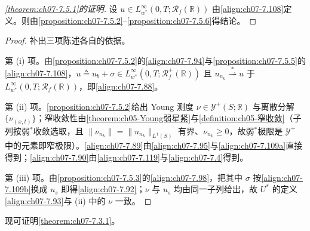 \documentclass[../../main.tex]{subfiles}%
\begin{document}
\begin{proof}[\cref{theorem:ch07-7.5.1}的证明]
设 $u\in L^\infty_{w^*}(0,T;\mathscr{R}_f(\mathbb{R}))$ 由\eqref{align:ch07-7.108}定义。则由\cref{proposition:ch07-7.5.2}--\cref{proposition:ch07-7.5.6}得结论。
\end{proof}

\begin{proof}
补出三项陈述各自的依据。

第 (i) 项。由\cref{proposition:ch07-7.5.2}的\eqref{align:ch07-7.94}与\cref{proposition:ch07-7.5.5}的\eqref{align:ch07-7.108}，$u\triangleq u_b+\sigma\in L^\infty_{w^*}(0,T;\mathscr{R}_f^+(\mathbb{R}))$ 且 $u_{n_k}\stackrel{*}{\rightharpoonup}u$ 于 $L^\infty_{w^*}(0,T;\mathscr{R}_f(\mathbb{R}))$，即\eqref{align:ch07-7.88}。

第 (ii) 项。\cref{proposition:ch07-7.5.2}给出 Young 测度 $\nu\in\mathcal{Y}^+(S;\mathbb{R})$ 与离散分解 $\{\nu_{(x,t)}\}$；窄收敛性由\cref{theorem:ch05-Young弱星紧}与\cref{definition:ch05-窄收敛}（子列按弱$^*$收敛选取，且 $\|\nu_{n_k}\|=\|u_{n_k}\|_{L^1(S)}$ 有界、$\nu_{n_k}\geqslant0$，故弱$^*$极限是 $\mathcal{Y}^+$ 中的元素即窄极限）。\eqref{align:ch07-7.89}由\eqref{align:ch07-7.95}与\eqref{align:ch07-7.109a}直接得到；\eqref{align:ch07-7.90}由\eqref{align:ch07-7.119}与\eqref{align:ch07-7.4}得到。

第 (iii) 项。由\cref{proposition:ch07-7.5.3}的\eqref{align:ch07-7.98}，把其中 $\sigma$ 按\eqref{align:ch07-7.109b}换成 $u_s$ 即得\eqref{align:ch07-7.92}；$\nu$ 与 $u_s$ 均由同一子列给出，故 $U^*$ 的定义\eqref{align:ch07-7.93}与 (ii) 中的 $\nu$ 一致。
\end{proof}

现可证明\cref{theorem:ch07-7.3.1}。
\end{document}
